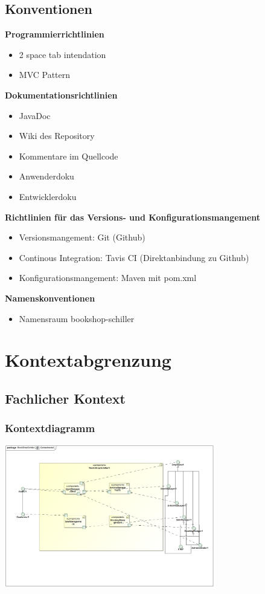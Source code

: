 \documentclass[a4paper]{article}
\begin{document}
\subsection{Konventionen}

\textbf{Programmierrichtlinien}
\begin{itemize}
	\item 2 space tab intendation
	\item MVC Pattern
\end{itemize}
\textbf{Dokumentationsrichtlinien}
\begin{itemize}
	\item JavaDoc
	\item Wiki des Repository
	\item Kommentare im Quellcode
	\item Anwenderdoku
	\item Entwicklerdoku
\end{itemize}
\textbf{Richtlinien für das Versions- und Konfigurationsmangement}
\begin{itemize}
	\item Versionsmangement: Git (Github)
	\item Continous Integration: Tavis CI (Direktanbindung zu Github)
	\item Konfigurationsmangement: Maven mit pom.xml
\end{itemize}
\textbf{Namenskonventionen}
\begin{itemize}
	\item Namensraum bookshop-schiller
\end{itemize}

\section{Kontextabgrenzung}

\subsection{Fachlicher Kontext}

\subsubsection{Kontextdiagramm}

\includegraphics[width=350px]{kontextmodell.jpg}
\end{document}
